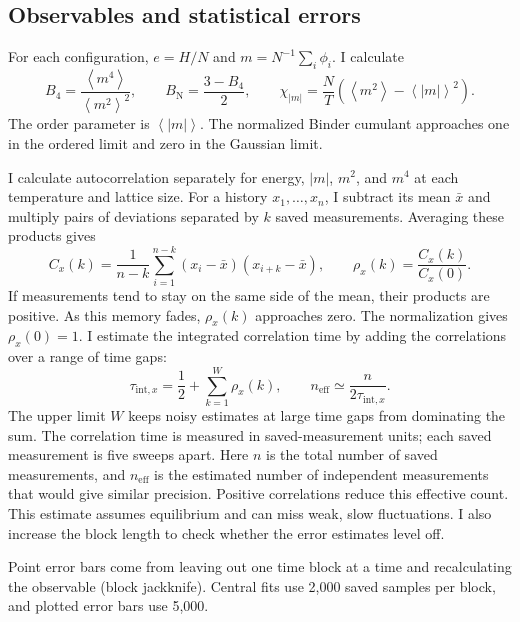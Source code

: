 \documentclass[11pt,letterpaper]{article}
\newcommand{\avg}[1]{\left\langle #1\right\rangle}
\newcommand{\BN}{B_{\mathrm N}}
\newcommand{\chiabs}{\chi_{|m|}}
\begin{document}
\subsection{Observables and statistical errors}
For each configuration, $e=H/N$ and $m=N^{-1}\sum_i\phi_i$. I calculate
\begin{equation}
 B_4=\frac{\avg{m^4}}{\avg{m^2}^2},\qquad
 \BN=\frac{3-B_4}{2},\qquad
 \chiabs=\frac NT\left(\avg{m^2}-\avg{|m|}^2\right).
\end{equation}
The order parameter is $\avg{|m|}$. The normalized Binder cumulant
approaches one in the ordered limit and zero in the Gaussian limit.

I calculate autocorrelation separately for energy, $|m|$, $m^2$, and
$m^4$ at each temperature and lattice size. For a history $x_1,\ldots,x_n$,
I subtract its mean $\bar x$ and multiply pairs of deviations separated
by $k$ saved measurements. Averaging these products gives
\begin{equation}
 C_x(k)=\frac{1}{n-k}\sum_{i=1}^{n-k}(x_i-\bar x)(x_{i+k}-\bar x),
 \qquad \rho_x(k)=\frac{C_x(k)}{C_x(0)}.
\end{equation}
If measurements tend to stay on the same side of the mean, their products
are positive. As this memory fades, $\rho_x(k)$ approaches zero.
The normalization gives $\rho_x(0)=1$. I estimate the integrated
correlation time by adding the correlations over a range of time gaps:
\begin{equation}
 \tau_{\mathrm{int},x}=\frac12+\sum_{k=1}^{W}\rho_x(k),
 \qquad n_{\mathrm{eff}}\simeq\frac{n}{2\tau_{\mathrm{int},x}}.
\end{equation}
The upper limit $W$ keeps noisy estimates at large time gaps from
dominating the sum. The correlation time is measured in saved-measurement
units; each saved measurement is five sweeps apart. Here $n$ is the total
number of saved measurements, and $n_{\mathrm{eff}}$ is the estimated
number of independent measurements that would give similar precision.
Positive correlations reduce this effective count. This estimate assumes
equilibrium and can miss weak, slow fluctuations. I also increase the
block length to check whether the error estimates level off.

Point error bars come from leaving out one time block at a time and
recalculating the observable (block jackknife). Central fits use 2,000
saved samples per block, and plotted error bars use 5,000.

\newpage
\end{document}
